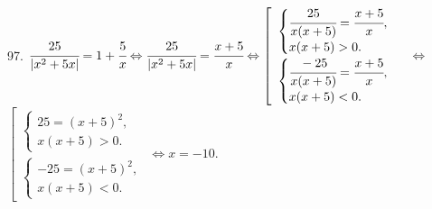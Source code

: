97. $\cfrac{25}{|x^2+5x|}=1+\cfrac{5}{x}\Leftrightarrow\cfrac{25}{|x^2+5x|}=\cfrac{x+5}{x}\Leftrightarrow
\left[\begin{array}{l}\begin{cases} \cfrac{25}{x(x+5)}=\cfrac{x+5}{x},\\ x(x+5)>0.\end{cases}\\
\begin{cases} \cfrac{-25}{x(x+5)}=\cfrac{x+5}{x},\\ x(x+5)<0.\end{cases}\end{array}\right.\Leftrightarrow$\\$
\left[\begin{array}{l}\begin{cases} 25=(x+5)^2,\\ x(x+5)>0.\end{cases}\\
\begin{cases} -25=(x+5)^2,\\ x(x+5)<0.\end{cases}\end{array}\right.\Leftrightarrow x=-10.$\\
